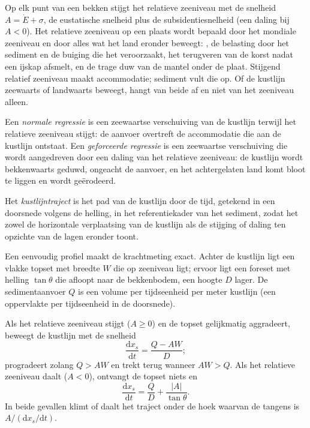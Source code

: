 Op elk punt van een bekken stijgt het relatieve zeeniveau met de snelheid $A = \dot E
+ \sigma$, de eustatische snelheid plus de subsidentiesnelheid (een daling bij $A < 0$).
Het relatieve zeeniveau op een plaats wordt bepaald door het mondiale zeeniveau en door
alles wat het land eronder beweegt: , de belasting door
het sediment en de buiging die het veroorzaakt, het terugveren van de korst nadat een
ijskap afsmelt, en de trage duw van de mantel onder de plaat. Stijgend
relatief zeeniveau maakt accommodatie; sediment vult die op. Of de
kustlijn zeewaarts of landwaarts beweegt, hangt van beide af en niet
van het zeeniveau alleen.

\begin{definition}\label{def:b3:sequence-stratigraphy:regression}
Een \emph{normale regressie} is een zeewaartse verschuiving van de
kustlijn terwijl het relatieve zeeniveau stijgt: de aanvoer overtreft de
accommodatie die aan de kustlijn ontstaat. Een \emph{geforceerde regressie}
is een zeewaartse verschuiving die wordt aangedreven door een daling van het relatieve zeeniveau: de
kustlijn wordt bekkenwaarts geduwd, ongeacht de aanvoer, en het achtergelaten land
komt bloot te liggen en wordt geërodeerd.
\end{definition}

\begin{definition}[Kustlijntraject]\label{def:b3:sequence-stratigraphy:trajectory}
Het \emph{kustlijntraject} is het pad van
de kustlijn door de tijd, getekend in een doorsnede volgens de helling, in het referentiekader van het
sediment, zodat het zowel de horizontale verplaatsing van de kustlijn als de
stijging of daling ten opzichte van de lagen eronder toont.
\end{definition}

Een eenvoudig profiel maakt de krachtmeting exact. Achter de kustlijn ligt een vlakke topset
met breedte $W$ die op zeeniveau ligt; ervoor ligt een foreset met helling
$\tan\theta$ die afloopt naar de bekkenbodem, een hoogte $D$ lager.
De sedimentaanvoer $Q$ is een volume per tijdseenheid per meter kustlijn (een oppervlakte per
tijdseenheid in de doorsnede).

\begin{proposition}[Kustlijntraject]\label{prop:b3:sequence-stratigraphy:trajectory}
Als het relatieve zeeniveau stijgt ($A \ge 0$) en de topset gelijkmatig aggradeert,
beweegt de kustlijn met de snelheid
\[
\frac{\mathrm dx_s}{\mathrm dt} = \frac{Q - AW}{D};
\]
progradeert zolang $Q > AW$ en trekt terug wanneer $AW > Q$. Als het relatieve zeeniveau
daalt ($A < 0$), ontvangt de topset niets en
\[
\frac{\mathrm dx_s}{\mathrm dt} = \frac{Q}{D} + \frac{|A|}{\tan\theta}.
\]
In beide gevallen klimt of daalt het traject onder de hoek waarvan de tangens is
$A/(\mathrm dx_s/\mathrm dt)$.
\end{proposition}

